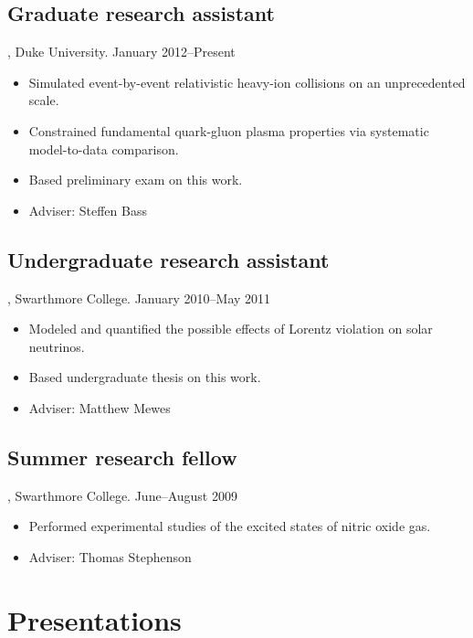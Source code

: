 \documentclass[letterpaper,10pt]{article}
\begin{document}
\subsection{Graduate research assistant}, Duke University. \hfill January 2012--Present

\begin{itemize}
  \item Simulated event-by-event relativistic heavy-ion collisions on an unprecedented scale.
  \item Constrained fundamental quark-gluon plasma properties via systematic model-to-data comparison.
  \item Based preliminary exam on this work.
  \item Adviser:  Steffen Bass
\end{itemize}


\subsection{Undergraduate research assistant}, Swarthmore College. \hfill January 2010--May 2011

\begin{itemize}
  \item Modeled and quantified the possible effects of Lorentz violation on solar neutrinos.
  \item Based undergraduate thesis on this work.
  \item Adviser:  Matthew Mewes
\end{itemize}



\subsection{Summer research fellow}, Swarthmore College. \hfill June--August 2009

\begin{itemize}
  \item Performed experimental studies of the excited states of nitric oxide gas.
  \item Adviser:  Thomas Stephenson
\end{itemize}



\pagebreak


\nocite{*}
{\raggedright\printbibliography[heading=bibintoc, title={Publications}]}


\section{Presentations}
\end{document}
